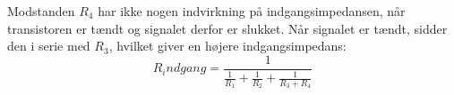 Modstanden $R_4$ har ikke nogen indvirkning på indgangsimpedansen, når transistoren er tændt og signalet derfor er slukket. Når signalet er tændt, sidder den i serie med $R_3$, hvilket giver en højere indgangsimpedans:
\begin{equation}
R_indgang=\frac{1}{\frac{1}{R_1}+\frac{1}{R_2}+\frac{1}{R_3+R_4}}
\end{equation}
